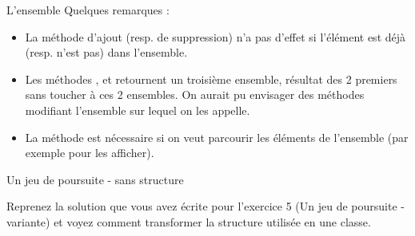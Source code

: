 \begin{Exercice}{L'ensemble}
	\medskip
	Quelques remarques :
	\begin{itemize}
		\item 
			La méthode d'ajout (resp. de suppression) n'a
			pas d'effet si l'élément est déjà
			(resp. n'est pas) dans l'ensemble.
		\item 
			Les méthodes , 
			 et 
			 retournent un troisième ensemble, 
			résultat des 2 premiers sans toucher
			à ces 2 ensembles. On aurait pu envisager des méthodes modifiant
			l'ensemble sur lequel on les appelle.
		\item 
			La méthode 
			est nécessaire si on veut parcourir les éléments de
			l'ensemble (par exemple pour les afficher).
	\end{itemize}
	
\end{Exercice}

\begin{Exercice}{Un jeu de poursuite - sans structure}

	Reprenez la solution que vous avez écrite pour l'exercice 5
	(Un jeu de poursuite - variante)
	et voyez comment transformer la structure utilisée en une classe.
	
\end{Exercice}
	
